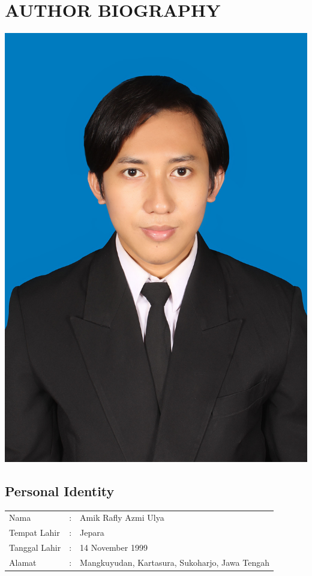\chapter*{AUTHOR BIOGRAPHY}
\begin{center}
	\includegraphics[height=0.2\textheight]{./ubah/foto_amik.jpg}
\end{center}
\section*{Personal Identity}
\begin{tabular}{p{3cm}cp{9cm}}
	Nama          & : &
	Amik Rafly Azmi Ulya                           \\
	Tempat Lahir  & : &
	Jepara                                         \\
	Tanggal Lahir & : &
	14 November 1999                               \\
	Alamat        & : &
	Mangkuyudan, Kartasura, Sukoharjo, Jawa Tengah \\
\end{tabular}

